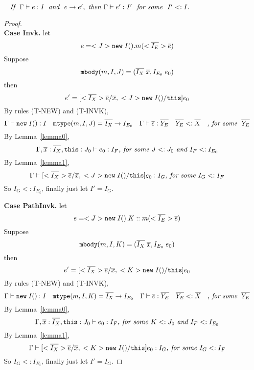 \begin{theorem}~\label{theorem_subject}
$\textit{If } \ \judgeewf \Gamma {e : I} \; \textit{ and } \ e \rightarrow e',\ 
\textit{then } \judgeewf \Gamma {e' : I'} \ \textit{ for some } \ I' <: I.$
\end{theorem}


\begin{proof} ~\\
\noindent \textbf{Case Invk.} 
let \[ e = <J>\texttt{new} \; I().m(<\overline{I_E}>\overline{e}) \] 
Suppose \[ \texttt{mbody}(m, I, J) = (\overline{I_X} \; \overline{x}, I_{E_0} \; e_0) \] 
then \[ e' =  [<\overline{I_X}>\overline{e}/\overline{x}, \; <J>\texttt{new} \; I()/\texttt{this} ] e_0 \] 
By rules (T-NEW) and (T-INVK), 
  \[ \Gamma \; {\vdash} \; \texttt{new} \; I():I \quad 
     \texttt{mtype}(m, I, J) = \overline{I_X} \rightarrow I_{E_0} \quad 
     \Gamma \; {\vdash} \; \overline{e} : \overline{Y_E} \quad
     \overline{Y_E} <: \overline{X} \quad
     \textit{, for some } \; \overline{Y_E}
  \]
By Lemma~\ref{lemma0},
    \[
    \Gamma, \overline{x}:\overline{I_X}, \texttt{this}:J_0 \; {\vdash} \; e_0:I_F \textit{, for some } J <: J_0 \textit{ and } I_F <: I_{E_0}
    \]
By Lemma~\ref{lemma1},
    \[
    \Gamma \; {\vdash} \; [<\overline{I_X}>\overline{e}/\overline{x}, \; <J>\texttt{new} \; I()/\texttt{this} ] e_0  :  I_G \textit{, for some } I_G <: I_F 
    \]
So $I_G <: I_{E_0}$, finally just let $I' = I_G$.

\noindent \textbf{Case PathInvk.}
let \[ e = <J>\texttt{new} \; I().K::m(<\overline{I_E}>\overline{e}) \]  
Suppose \[ \texttt{mbody}(m, I, K) = (\overline{I_X} \; \overline{x}, I_{E_0} \; e_0) \] 
then \[ e' =  [<\overline{I_X}>\overline{e}/\overline{x}, \; <K>\texttt{new} \; I()/\texttt{this} ] e_0 \] 
By rules (T-NEW) and (T-INVK), 
  \[ \Gamma \; {\vdash} \; \texttt{new} \; I():I \quad 
     \texttt{mtype}(m, I, K) = \overline{I_X} \rightarrow I_{E_0} \quad 
     \Gamma \; {\vdash} \; \overline{e} : \overline{Y_E} \quad
     \overline{Y_E} <: \overline{X} \quad
     \textit{, for some } \; \overline{Y_E}
  \]
By Lemma~\ref{lemma0},
    \[
    \Gamma, \overline{x}:\overline{I_X}, \texttt{this}:J_0 \; {\vdash} \; e_0:I_F \textit{, for some } K <: J_0 \textit{ and } I_F <: I_{E_0}
    \]
By Lemma~\ref{lemma1},
    \[
    \Gamma \; {\vdash} \; [<\overline{I_X}>\overline{e}/\overline{x}, \; <K>\texttt{new} \; I()/\texttt{this} ] e_0  :  I_G \textit{, for some } I_G <: I_F 
    \]
So $I_G <: I_{E_0}$, finally just let $I' = I_G$.


\end{proof}
